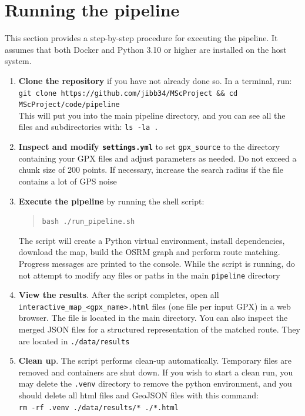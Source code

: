 \documentclass[11pt,a4paper]{article}
\begin{document}
\section{Running the pipeline}
This section provides a step-by-step procedure for executing the pipeline.  It
assumes that both Docker and Python 3.10 or higher are installed on the host
system.

\begin{enumerate}
	\item \textbf{Clone the repository} if you have not already done so.  In
	      a terminal, run:\\
	      \texttt{\small git clone https://github.com/jibb34/MScProject \&\& cd MScProject/code/pipeline}\\
	      This will put you into the main pipeline directory, and you can see all the files and subdirectories with: \texttt{ls -la .}
	\item \textbf{Inspect and modify \texttt{settings.yml}} to set \texttt{gpx\_source} to the directory containing your GPX files and adjust parameters as needed.  Do not exceed a chunk size of
	      200 points.  If necessary, increase the search radius if the file contains a lot of GPS noise
	\item \textbf{Execute the pipeline} by running the shell script:
	      \begin{quote}
		      \texttt{bash ./run\_pipeline.sh}
	      \end{quote}
	      The script will create a Python virtual environment, install
	      dependencies, download the map, build the OSRM graph and perform route
	      matching.  Progress messages are printed to the console. While the script is running,
	      do not attempt to modify any files or paths in the main \texttt{pipeline} directory
	\item \textbf{View the results}.  After the script completes, open all
	      \texttt{\small interactive\_map\_\textless gpx\_name\textgreater{}.html} files (one file per input GPX) in a web browser.  The file is
	      located in the main directory.  You can also inspect
	      the merged JSON files for a structured representation of the matched
	      route. They are located in \texttt{./data/results}
	\item \textbf{Clean up}.  The script performs clean-up automatically.
	      Temporary files are removed and containers are shut down. If you wish to start a clean
	      run, you may delete the \texttt{.venv} directory to remove the python environment, and
	      you should delete all html files and GeoJSON files with this command:\\
	      \texttt{rm -rf .venv ./data/results/* ./*.html}
\end{enumerate}
\end{document}
